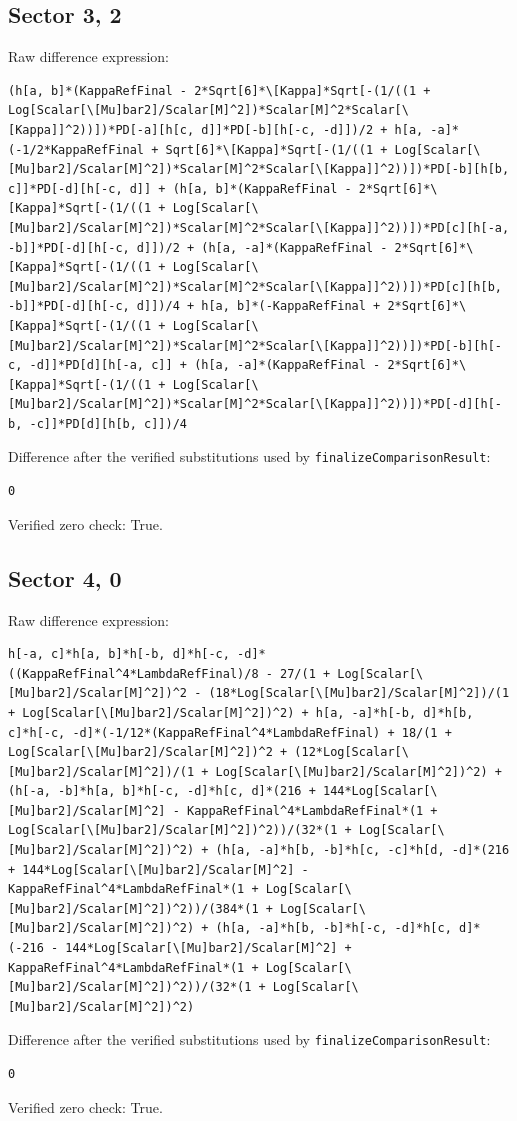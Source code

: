 \documentclass[11pt]{article}
\begin{document}
\subsection*{Sector {3, 2}}
Raw difference expression:
\begin{verbatim}
(h[a, b]*(KappaRefFinal - 2*Sqrt[6]*\[Kappa]*Sqrt[-(1/((1 + Log[Scalar[\[Mu]bar2]/Scalar[M]^2])*Scalar[M]^2*Scalar[\[Kappa]]^2))])*PD[-a][h[c, d]]*PD[-b][h[-c, -d]])/2 + h[a, -a]*(-1/2*KappaRefFinal + Sqrt[6]*\[Kappa]*Sqrt[-(1/((1 + Log[Scalar[\[Mu]bar2]/Scalar[M]^2])*Scalar[M]^2*Scalar[\[Kappa]]^2))])*PD[-b][h[b, c]]*PD[-d][h[-c, d]] + (h[a, b]*(KappaRefFinal - 2*Sqrt[6]*\[Kappa]*Sqrt[-(1/((1 + Log[Scalar[\[Mu]bar2]/Scalar[M]^2])*Scalar[M]^2*Scalar[\[Kappa]]^2))])*PD[c][h[-a, -b]]*PD[-d][h[-c, d]])/2 + (h[a, -a]*(KappaRefFinal - 2*Sqrt[6]*\[Kappa]*Sqrt[-(1/((1 + Log[Scalar[\[Mu]bar2]/Scalar[M]^2])*Scalar[M]^2*Scalar[\[Kappa]]^2))])*PD[c][h[b, -b]]*PD[-d][h[-c, d]])/4 + h[a, b]*(-KappaRefFinal + 2*Sqrt[6]*\[Kappa]*Sqrt[-(1/((1 + Log[Scalar[\[Mu]bar2]/Scalar[M]^2])*Scalar[M]^2*Scalar[\[Kappa]]^2))])*PD[-b][h[-c, -d]]*PD[d][h[-a, c]] + (h[a, -a]*(KappaRefFinal - 2*Sqrt[6]*\[Kappa]*Sqrt[-(1/((1 + Log[Scalar[\[Mu]bar2]/Scalar[M]^2])*Scalar[M]^2*Scalar[\[Kappa]]^2))])*PD[-d][h[-b, -c]]*PD[d][h[b, c]])/4
\end{verbatim}
Difference after the verified substitutions used by \texttt{finalizeComparisonResult}:
\begin{verbatim}
0
\end{verbatim}
Verified zero check: True.

\subsection*{Sector {4, 0}}
Raw difference expression:
\begin{verbatim}
h[-a, c]*h[a, b]*h[-b, d]*h[-c, -d]*((KappaRefFinal^4*LambdaRefFinal)/8 - 27/(1 + Log[Scalar[\[Mu]bar2]/Scalar[M]^2])^2 - (18*Log[Scalar[\[Mu]bar2]/Scalar[M]^2])/(1 + Log[Scalar[\[Mu]bar2]/Scalar[M]^2])^2) + h[a, -a]*h[-b, d]*h[b, c]*h[-c, -d]*(-1/12*(KappaRefFinal^4*LambdaRefFinal) + 18/(1 + Log[Scalar[\[Mu]bar2]/Scalar[M]^2])^2 + (12*Log[Scalar[\[Mu]bar2]/Scalar[M]^2])/(1 + Log[Scalar[\[Mu]bar2]/Scalar[M]^2])^2) + (h[-a, -b]*h[a, b]*h[-c, -d]*h[c, d]*(216 + 144*Log[Scalar[\[Mu]bar2]/Scalar[M]^2] - KappaRefFinal^4*LambdaRefFinal*(1 + Log[Scalar[\[Mu]bar2]/Scalar[M]^2])^2))/(32*(1 + Log[Scalar[\[Mu]bar2]/Scalar[M]^2])^2) + (h[a, -a]*h[b, -b]*h[c, -c]*h[d, -d]*(216 + 144*Log[Scalar[\[Mu]bar2]/Scalar[M]^2] - KappaRefFinal^4*LambdaRefFinal*(1 + Log[Scalar[\[Mu]bar2]/Scalar[M]^2])^2))/(384*(1 + Log[Scalar[\[Mu]bar2]/Scalar[M]^2])^2) + (h[a, -a]*h[b, -b]*h[-c, -d]*h[c, d]*(-216 - 144*Log[Scalar[\[Mu]bar2]/Scalar[M]^2] + KappaRefFinal^4*LambdaRefFinal*(1 + Log[Scalar[\[Mu]bar2]/Scalar[M]^2])^2))/(32*(1 + Log[Scalar[\[Mu]bar2]/Scalar[M]^2])^2)
\end{verbatim}
Difference after the verified substitutions used by \texttt{finalizeComparisonResult}:
\begin{verbatim}
0
\end{verbatim}
Verified zero check: True.
\end{document}
